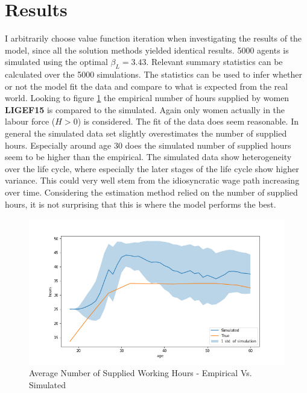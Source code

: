 \section{Results}

I arbitrarily choose value function iteration when investigating the results of the model, since all the solution methods yielded identical results. 5000 agents is simulated using the optimal $\beta_L = 3.43$. Relevant summary statistics can be calculated over the 5000 simulations. The statistics can be used to infer whether or not the model fit the data and compare to what is expected from the real world. Looking to figure \ref{fig:dqi_model1_average_path_sim_vs_empirical} the empirical number of hours supplied by women \textbf{LIGEF15} is compared to the simulated. Again only women actually in the labour force  ($H>0$) is considered. The fit of the data does seem reasonable. In general the simulated data set slightly overestimates the number of supplied hours. Especially around age 30 does the simulated number of supplied hours seem to be higher than the empirical. The simulated data show heterogeneity over the life cycle, where especially the later stages of the life cycle show higher variance. This could very well stem from the idiosyncratic wage path increasing over time. Considering the estimation method relied on the number of supplied hours, it is not surprising that this is where the model performs the best. 


\begin{figure}
    \centering
    \includegraphics[scale=0.4]{figures/dqi_model1_estimation_labour_supply.png}
    \caption{Average Number of Supplied Working Hours - Empirical Vs. Simulated}
    \label{fig:dqi_model1_average_path_sim_vs_empirical}
\end{figure}

